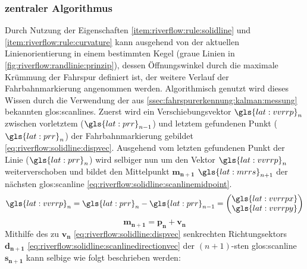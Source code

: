 \subsubsection{zentraler Algorithmus}
Durch Nutzung der Eigenschaften \ref{item:riverflow:rule:solidline} und  \ref{item:riverflow:rule:curvature} kann ausgehend von der aktuellen Linienorientierung in einem bestimmten Kegel (graue Linien in \ref{fig:riverflow:randlinie:prinzip}), dessen Öffnungswinkel durch die maximale Krümmung der Fahrspur definiert ist, der weitere Verlauf der Fahrbahnmarkierung angenommen werden.
Algorithmisch genutzt wird dieses Wissen durch die Verwendung der aus \ref{ssec:fahrspurerkennung:kalman:messung} bekannten \glspl{glos:scanline}.
Zuerst wird ein Verschiebungsvektor \(\gls{lat:vvrrp}_{\scl{n}}\) zwischen vorletztem (\(\gls{lat:prr}_{\scl{n}-1}\)) und letztem gefundenen Punkt  (\(\gls{lat:prr}_{\scl{n}}\)) der Fahrbahnmarkierung gebildet \eqref{eq:riverflow:solidline:dispvec}. Ausgehend vom letzten gefundenen Punkt der Linie (\(\gls{lat:prr}_{\scl{n}}\)) wird selbiger nun um den Vektor \(\gls{lat:vvrrp}_{\scl{n}}\) weiterverschoben und bildet den Mittelpunkt  \begin{math} \boldsymbol{m_{n+1}}  \end{math} \(\gls{lat:mrrs}_{\scl{n}+1}\) der nächsten \gls{glos:scanline} \eqref{eq:riverflow:solidline:scanlinemidpoint}.
\begin{equation}
\label{eq:riverflow:solidline:dispvec}
\gls{lat:vvrrp}_{\scl{n}} =  \gls{lat:prr}_{\scl{n}} - \gls{lat:prr}_{\scl{n}-1}
= 
\begin{pmatrix}
\gls{lat:vvrrpx} \\
\gls{lat:vvrrpy}
\end{pmatrix}
\end{equation}
\begin{equation}
\label{eq:riverflow:solidline:scanlinemidpoint}
\boldsymbol{m_{n+1}} =  \boldsymbol{p_n} + \boldsymbol{v_n}
\end{equation}
Mithilfe des zu \begin{math} \boldsymbol{v_n} \end{math} \eqref{eq:riverflow:solidline:dispvec} senkrechten Richtungsektors \begin{math} \boldsymbol{d_{n+1}} \end{math} \eqref{eq:riverflow:solidline:scanlinedirectionvec} der \begin{math} (n+1)\end{math}-sten  \gls{glos:scanline} \begin{math} \boldsymbol{s_{n+1}} \end{math} kann selbige wie folgt beschrieben werden:

